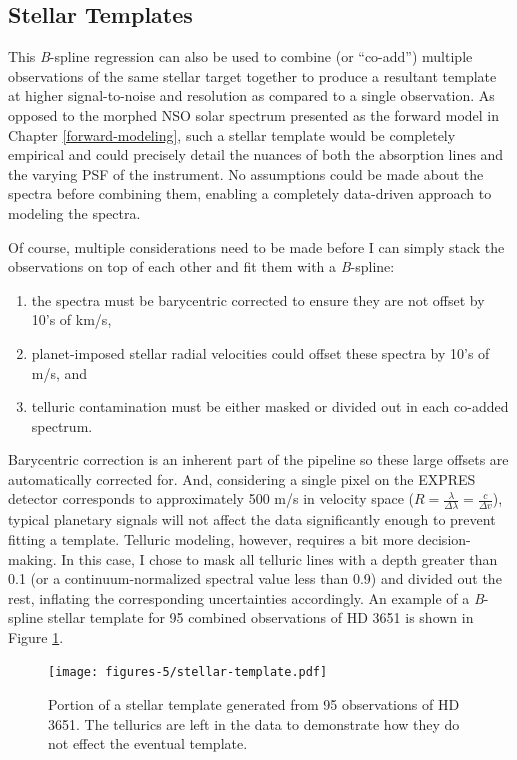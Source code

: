 \subsection{Stellar Templates} \label{pipeline2:bspline:templates}

This \textit{B}-spline regression can also be used to combine (or ``co-add'') multiple observations of the same stellar target together to produce a resultant template at higher signal-to-noise and resolution as compared to a single observation. As opposed to the morphed NSO solar spectrum presented as the forward model in Chapter \ref{forward-modeling}, such a stellar template would be completely empirical and could precisely detail the nuances of both the absorption lines and the varying PSF of the instrument. No assumptions could be made about the spectra before combining them, enabling a completely data-driven approach to modeling the spectra.

Of course, multiple considerations need to be made before I can simply stack the observations on top of each other and fit them with a \textit{B}-spline:
\begin{enumerate}
    \item the spectra must be barycentric corrected to ensure they are not offset by 10's of km/s,
    \item planet-imposed stellar radial velocities could offset these spectra by 10's of m/s, and
    \item telluric contamination must be either masked or divided out in each co-added spectrum.
\end{enumerate}
Barycentric correction is an inherent part of the pipeline so these large offsets are automatically corrected for. And, considering a single pixel on the EXPRES detector corresponds to approximately 500 m/s in velocity space ($R = \frac{\lambda}{\Delta\lambda} = \frac{c}{\Delta v}$), typical planetary signals will not affect the data significantly enough to prevent fitting a template. Telluric modeling, however, requires a bit more decision-making. In this case, I chose to mask all telluric lines with a depth greater than 0.1 (or a continuum-normalized spectral value less than 0.9) and divided out the rest, inflating the corresponding uncertainties accordingly. An example of a \textit{B}-spline stellar template for 95 combined observations of HD 3651 is shown in Figure \ref{fig:stellar-template}. 

\begin{figure}
    \centering
    \texttt{[image: figures-5/stellar-template.pdf]}
    \caption[HD 3651 stellar template]{Portion of a stellar template generated from 95 observations of HD 3651. The tellurics are left in the data to demonstrate how they do not effect the eventual template.}
    \label{fig:stellar-template}
\end{figure}

